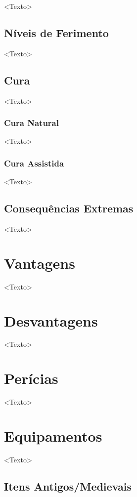 \documentclass[a4paper, twocolumn, 10pt]{book}
\begin{document}
<Texto>

\section{Níveis de Ferimento}

<Texto>

\section{Cura}

<Texto>

\subsection{Cura Natural}

<Texto>

\subsection{Cura Assistida}

<Texto>

\section{Consequências Extremas}

<Texto>

\chapter{Vantagens}

<Texto>

\chapter{Desvantagens}

<Texto>

\chapter{Perícias}

<Texto>

\chapter{Equipamentos}

<Texto>

\section{Itens Antigos/Medievais}
\end{document}
